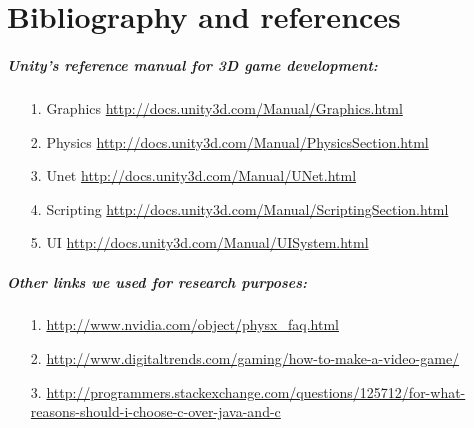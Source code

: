 \chapter{Bibliography and references}

\paragraph{\bfseries Unity's reference manual for 3D game development:}

\begin{itemize}
    \item[1.]{Graphics}{ \url{http://docs.unity3d.com/Manual/Graphics.html}}
    \item[2.]{Physics}{ \url{http://docs.unity3d.com/Manual/PhysicsSection.html}}
    \item[3.]{Unet}{ \url{http://docs.unity3d.com/Manual/UNet.html}}
    \item[4.]{Scripting}{ \url{http://docs.unity3d.com/Manual/ScriptingSection.html}}
    \item[5.]{UI}{ \url{http://docs.unity3d.com/Manual/UISystem.html}}
\end{itemize}

\paragraph{\bfseries Other links we used for research purposes:}

\begin{itemize}
    \item[1.]{}{ \url{http://www.nvidia.com/object/physx_faq.html}}
    \item[2.]{}{ \url{http://www.digitaltrends.com/gaming/how-to-make-a-video-game/}}
    \item[3.]{}{ \url{http://programmers.stackexchange.com/questions/125712/for-what-reasons-should-i-choose-c-over-java-and-c}}
\end{itemize}

